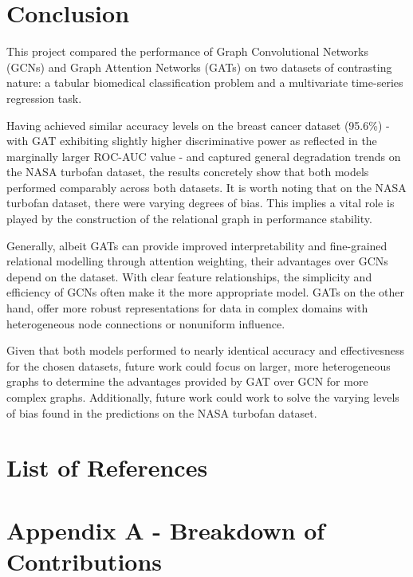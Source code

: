 \documentclass[12pt]{article}
\begin{document}
\pagebreak
\section{Conclusion}
This project compared the performance of Graph Convolutional Networks (GCNs) and Graph Attention Networks (GATs) on two datasets of contrasting nature: a tabular biomedical classification problem and a multivariate time-series regression task.

Having achieved similar accuracy levels on the breast cancer dataset (95.6\%) - with GAT exhibiting slightly higher discriminative power as reflected in the marginally larger ROC-AUC value - and captured general degradation trends on the NASA turbofan dataset, the results concretely show that both models performed comparably across both datasets.
It is worth noting that on the NASA turbofan dataset, there were varying degrees of bias. This implies a vital role is played by the construction of the relational graph in performance stability.

Generally, albeit GATs can provide improved interpretability and fine-grained relational modelling through attention weighting, their advantages over GCNs depend on the dataset.
With clear feature relationships, the simplicity and efficiency of GCNs often make it the more appropriate model.
GATs on the other hand, offer more robust representations for data in complex domains with heterogeneous node connections or nonuniform influence.

Given that both models performed to nearly identical accuracy and effectivesness for the chosen datasets,
future work could focus on larger, more heterogeneous graphs to determine the advantages provided by GAT over GCN for more complex graphs.
Additionally, future work could work to solve the varying levels of bias found in the predictions on the NASA turbofan dataset.

\pagebreak
\section*{List of References}
\renewcommand{\thepage}{R-\arabic{page}}
\printbibliography[heading=none]

\pagebreak
\section*{Appendix A - Breakdown of Contributions}
\renewcommand{\thepage}{A-\arabic{page}}
\end{document}
